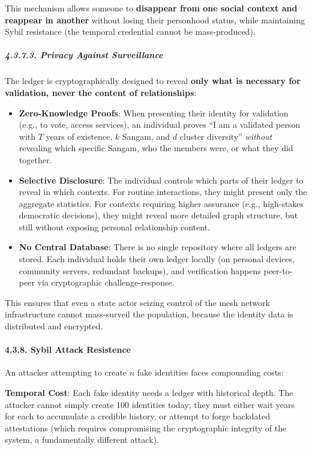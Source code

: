 This mechanism allows someone to \textbf{disappear from one social
context and reappear in another} without losing their personhood status,
while maintaining Sybil resistance (the temporal credential cannot be
mass-produced).

\subparagraph{4.3.7.3. Privacy Against
Surveillance}\label{privacy-against-surveillance}

The ledger is cryptographically designed to reveal \textbf{only what is
necessary for validation, never the content of relationships}:

\begin{itemize}
\item
  \textbf{Zero-Knowledge Proofs}: When presenting their identity for
  validation (e.g., to vote, access services), an individual proves ``I
  am a validated person with \(T\) years of existence, \(k\) Sangam, and
  \(d\) cluster diversity'' \emph{without} revealing which specific
  Sangam, who the members were, or what they did together.
\item
  \textbf{Selective Disclosure}: The individual controls which parts of
  their ledger to reveal in which contexts. For routine interactions,
  they might present only the aggregate statistics. For contexts
  requiring higher assurance (e.g., high-stakes democratic decisions),
  they might reveal more detailed graph structure, but still without
  exposing personal relationship content.
\item
  \textbf{No Central Database}: There is no single repository where all
  ledgers are stored. Each individual holds their own ledger locally (on
  personal devices, community servers, redundant backups), and
  verification happens peer-to-peer via cryptographic
  challenge-response.
\end{itemize}

This ensures that even a state actor seizing control of the mesh network
infrastructure cannot mass-surveil the population, because the identity
data is distributed and encrypted.

\paragraph{4.3.8. Sybil Attack
Resistence}\label{sybil-attack-resistence}

An attacker attempting to create \(n\) fake identities faces compounding
costs:

\textbf{Temporal Cost}: Each fake identity needs a ledger with
historical depth. The attacker cannot simply create 100 identities
today; they must either wait years for each to accumulate a credible
history, or attempt to forge backdated attestations (which requires
compromising the cryptographic integrity of the system, a fundamentally
different attack).

